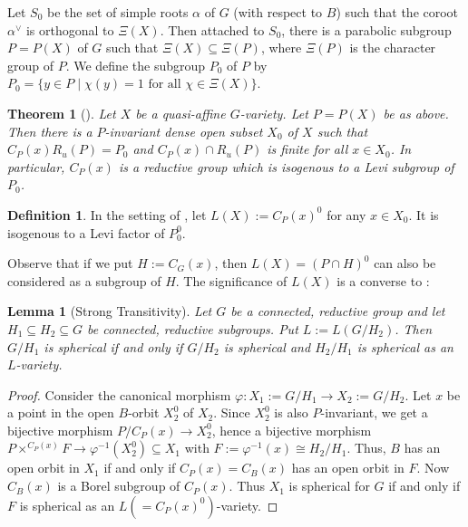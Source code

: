 \documentclass[12pt]{amsart}
\renewcommand{\phi}{\varphi}
\numberwithin{equation}{section}
\newtheorem{theorem}[theorem]{Theorem}
\newtheorem{lemma}[lemma]{Lemma}
\theoremstyle{definition}
\newtheorem{definition}[definition]{Definition}
\begin{document}
Let $S_0$ be the set of simple roots $\alpha$ of $G$ (with respect to
$B$) such that the coroot $\alpha^\vee$ is orthogonal to
$\Xi(X)$. Then attached to $S_0$, there is a parabolic subgroup
$P = P(X)$ of $G$ such that $\Xi(X)\subseteq\Xi(P)$, where $\Xi(P)$ is
the character group of $P$.  We define the subgroup $P_0$ of $P$ by
$P_0 = \{y \in P \mid \chi(y)=1\text{ for all } \chi\in\Xi(X)\}$.

\begin{theorem}[{\cite[Thm.\ 4.1]{KR}}]
  \label{thm:genstab}
  Let $X$ be a quasi-affine $G$-variety. Let $P = P(X)$ be as
  above. Then there is a $P$-invariant dense open subset $X_0$ of $X$
  such that $C_P(x) R_u(P) = P_0$ and $C_P(x)\cap R_u(P)$ is finite
  for all $x\in X_0$. In particular, $C_P(x)$ is a reductive group
  which is isogenous to a Levi subgroup of $P_0$.
\end{theorem}

\begin{definition}\label{def:LX}
  In the setting of , let $L(X):=C_P(x)^0$ for any $x\in X_0$. It is
  isogenous to a Levi factor of $P_0^0$.
\end{definition}

Observe that if we put $H:=C_G(x)$, then $L(X)=(P\cap H)^0$ can also be
considered as a subgroup of $H$. The significance of $L(X)$ is a
converse to :

\begin{lemma}[Strong Transitivity]\label{lemma:hard}
  Let $G$ be a connected, reductive group and let
  $H_1\subseteq H_2\subseteq G$ be connected, reductive subgroups. Put
  $L:=L(G/H_2)$. Then $G/H_1$ is spherical if and only if $G/H_2$ is
  spherical and $H_2/H_1$ is spherical as an $L$-variety.
\end{lemma}

\begin{proof}
  Consider the canonical morphism $\phi:X_1:=G/H_1\to X_2:=G/H_2$. Let $x$ be a
  point in the open $B$-orbit $X_2^0$ of $X_2$. Since $X_2^0$ is also
  $P$-invariant, we get a bijective morphism $P/C_P(x)\to X_2^0$, hence a
  bijective morphism
  $P\times^{C_P(x)}F\to\phi^{-1}(X_2^0)\subseteq X_1$ with
  $F :=\phi^{-1}(x)\cong H_2/H_1$. Thus, $B$ has an open orbit in $X_1$
  if and only if $C_P(x)=C_B(x)$ has an open orbit in $F$. Now
  $C_B(x)$ is a Borel subgroup of $C_P(x)$. Thus $X_1$ is spherical for $G$ if
  and only if $F$ is spherical as an $L (=C_P(x)^0)$-variety.
\end{proof}
\end{document}
